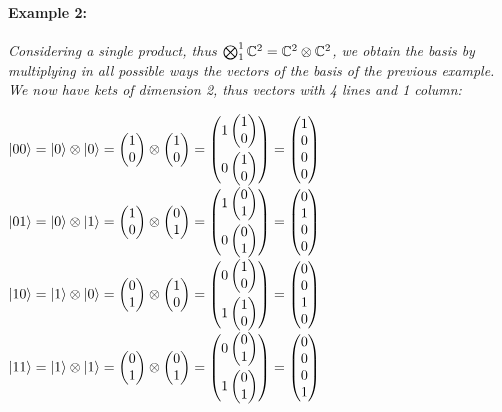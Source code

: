\documentclass[english]{article}
\newcommand{\sbigotimes}{%
	\mathop{\mathchoice{\textstyle\bigotimes}{\bigotimes}{\bigotimes}{\bigotimes}}%
}
\newcommand{\zeroket}{\begin{pmatrix} 1 \\ 0 \end{pmatrix}}
\newcommand{\oneket}{\begin{pmatrix} 0 \\ 1 \end{pmatrix}}
\begin{document}
			\paragraph{Example 2:} \emph{Considering a single product, thus $\sbigotimes_1^{1} \mathbb{C}^{2} = \mathbb{C}^{2} \otimes \mathbb{C}^{2}$, we obtain the basis by multiplying in all possible ways the vectors of the basis of the previous example. We now have kets of dimension 2, thus vectors with 4 lines and 1 column:}
			\begin{center}
					$
					|00\rangle = |0\rangle \otimes |0\rangle = \zeroket \otimes \zeroket = 
					\begin{pmatrix}
					1\zeroket \vspace{3pt} \\
					0\zeroket
					\end{pmatrix} =
					\begin{pmatrix}
					1 \\ 0 \\ 0 \\ 0
					\end{pmatrix}
					$\vfill
					$
					|01\rangle = |0\rangle \otimes |1\rangle = \zeroket \otimes \oneket = 
					\begin{pmatrix}
					1\oneket \vspace{3pt} \\
					0\oneket
					\end{pmatrix} =
					\begin{pmatrix}
					0 \\ 1 \\ 0 \\ 0
					\end{pmatrix}
					$ \vfill
					$
					|10\rangle = |1\rangle \otimes |0\rangle = \oneket \otimes \zeroket = 
					\begin{pmatrix}
					0\zeroket \vspace{3pt} \\
					1\zeroket
					\end{pmatrix} =
					\begin{pmatrix}
					0 \\ 0 \\ 1 \\ 0
					\end{pmatrix}
					$ \vfill
					$
					|11\rangle = |1\rangle \otimes |1\rangle = \oneket \otimes \oneket = 
					\begin{pmatrix}
					0\oneket \vspace{3pt} \\
					1\oneket
					\end{pmatrix} =
					\begin{pmatrix}
					0 \\ 0 \\ 0 \\ 1
					\end{pmatrix}
					$
			\end{center}
		
\end{document}
